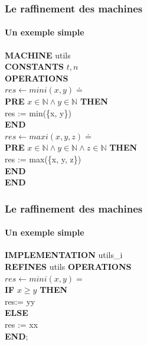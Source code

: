 \documentclass[11pt,a4paper,xcolor=table]{beamer} %
\begin{document}
\begin{frame}
\frametitle{Le raffinement des machines}
\framesubtitle{Un exemple simple}
\noindent \textbf{MACHINE} utils \\
\textbf{CONSTANTS} $t,n$ \\
\textbf{OPERATIONS} \\
$res \leftarrow mini(x, y) \doteq$ \\
\hspace*{1em}  \textbf{PRE} $x \in \mathbb{N} \wedge  y \in \mathbb{N} $ \textbf{THEN} \\
\hspace*{2em} res := min(\{x, y\})  \\
\hspace*{1em} \textbf{END} \\
$res \leftarrow maxi(x, y, z) \doteq$ \\
\hspace*{1em}  \textbf{PRE} $x \in \mathbb{N} \wedge  y \in \mathbb{N} \wedge z \in \mathbb{N}$ \textbf{THEN} \\
\hspace*{2em} res := max(\{x, y, z\})  \\
\hspace*{1em} \textbf{END} \\
\textbf{END}
\end{frame}

\begin{frame}
\frametitle{Le raffinement des machines}
\framesubtitle{Un exemple simple}
\noindent \textbf{IMPLEMENTATION}  utils\_i \\
\textbf{REFINES} utils
\textbf{OPERATIONS} \\
$res \leftarrow mini ( x , y ) =$ \\
\hspace*{1em}    \textbf{IF}  $x \geq y$ \textbf{THEN} \\
\hspace*{2em}        res:= yy \\
\hspace*{1em}    \textbf{ELSE} \\
\hspace*{2em}        res := xx \\
\hspace*{1em}    \textbf{END}; \\
\end{frame}
\end{document}
